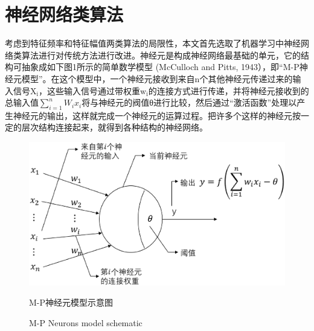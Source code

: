 \section{神经网络类算法}
\indent 考虑到特征频率和特征幅值两类算法的局限性，本文首先选取了机器学习中神经网络类算法进行对传统方法进行改进。神经元是构成神经网络最基础的单元，它的结构可抽象成如下图1所示的简单数学模型 (McCulloch and Pitts, 1943），即“M-P神经元模型”。在这个模型中，一个神经元接收到来自n个其他神经元传递过来的输入信号$\mathrm{X}_{\mathrm{i}}$，这些输入信号通过带权重$\mathrm{w}_{\mathrm{i}}$的连接方式进行传递，并将神经元接收到的总输入值$\sum_{i=1}^{n} W_{i} x_{i}$将与神经元的阀值θ进行比较，然后通过“激活函数”处理以产生神经元的输出，这样就完成一个神经元的运算过程。把许多个这样的神经元按一定的层次结构连接起来，就得到各种结构的神经网络。\\
\begin{figure}[!h] 
\centering 
 \includegraphics[width=0.75\linewidth]{img/mp.eps} 
 \renewcommand{\figurename}{图} 
\caption{M-P神经元模型示意图} 
\addtocounter{figure}{-1} \vspace{-5pt} 
\renewcommand{\figurename}{Fig} 
\caption{M-P Neurons model schematic} 
\renewcommand{\figurename}{图} 
\label{fig:network-device-influence.png} 
\end{figure}
